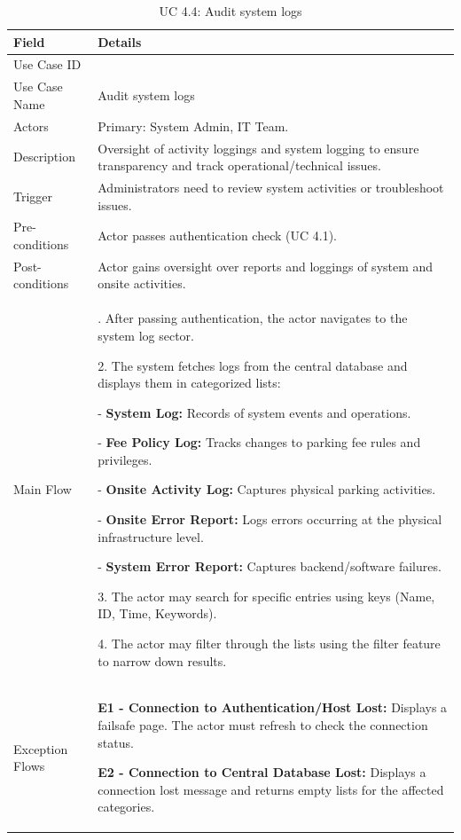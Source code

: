 \begin{table}[H]
\small
\renewcommand{\arraystretch}{1.4}
\begin{tabularx}{\textwidth}{|>{\raggedright\arraybackslash}p{3.5cm}|>{\RaggedRight\arraybackslash}X|}
\hline
\rowcolor{gray!20} \textbf{Field} & \textbf{Details} \\
\hline
Use Case ID & 4.4 \\
\hline
Use Case Name & Audit system logs \\
\hline
Actors & Primary: System Admin, IT Team. \\
\hline
Description & Oversight of activity loggings and system logging to ensure transparency and track operational/technical issues. \\
\hline
Trigger & Administrators need to review system activities or troubleshoot issues. \\
\hline
Pre-conditions & Actor passes authentication check (UC 4.1). \\
\hline
Post-conditions & Actor gains oversight over reports and loggings of system and onsite activities. \\
\hline
Main Flow & 
1. After passing authentication, the actor navigates to the system log sector. \par
2. The system fetches logs from the central database and displays them in categorized lists: \par
\hspace{1em} - \textbf{System Log:} Records of system events and operations. \par
\hspace{1em} - \textbf{Fee Policy Log:} Tracks changes to parking fee rules and privileges. \par
\hspace{1em} - \textbf{Onsite Activity Log:} Captures physical parking activities. \par
\hspace{1em} - \textbf{Onsite Error Report:} Logs errors occurring at the physical infrastructure level. \par
\hspace{1em} - \textbf{System Error Report:} Captures backend/software failures. \par
3. The actor may search for specific entries using keys (Name, ID, Time, Keywords). \par
4. The actor may filter through the lists using the filter feature to narrow down results. \\
\hline
Exception Flows & 
\textbf{E1 - Connection to Authentication/Host Lost:} Displays a failsafe page. The actor must refresh to check the connection status. \par \vspace{0.5em}
\textbf{E2 - Connection to Central Database Lost:} Displays a connection lost message and returns empty lists for the affected categories. \\
\hline
\end{tabularx}
\caption{UC 4.4: Audit system logs}
\label{tab:uc4.4}
\end{table}